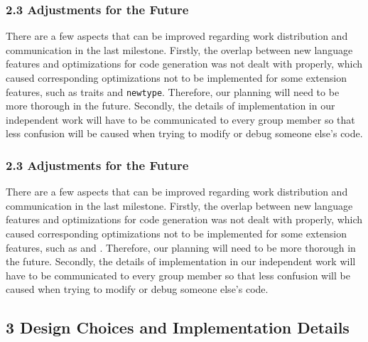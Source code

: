 \documentclass[10pt,a4paper]{report}
\begin{document}
  \subsubsection*{2.3 Adjustments for the Future}
  There are a few aspects that can be improved regarding work distribution and
  communication in the last milestone. Firstly, the overlap between new language
  features and optimizations for code generation was not dealt with properly,
  which caused corresponding optimizations not to be implemented for some
  extension features, such as traits and \texttt{newtype}. Therefore, our
  planning will need to be more thorough in the future. Secondly, the details of
  implementation in our independent work will have to be communicated to every
  group member so that less confusion will be caused when trying to modify or
  debug someone else’s code.



  \subsubsection*{2.3	Adjustments for the Future}
  There are a few aspects that can be improved regarding work distribution and communication
   in the last milestone. Firstly, the overlap between new language features and 
   optimizations for code generation was not dealt with properly, which caused corresponding 
   optimizations not to be implemented for some extension features, such as  and 
   . Therefore, our planning will need to be more thorough in the future. 
   Secondly, the details of implementation in our independent work will have to be communicated 
   to every group member so that less confusion will be caused when trying to modify or debug 
   someone else’s code.

  \subsection*{3 Design Choices and Implementation Details}
  
\end{document}

